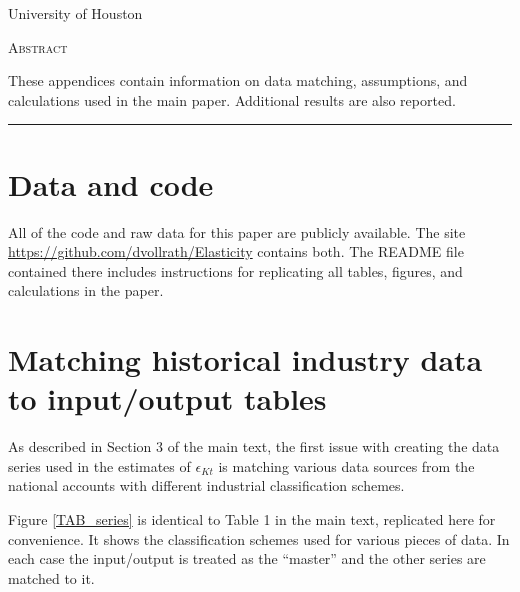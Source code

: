 \documentclass[11pt]{article}
\begin{document}
\begin{titlepage}
\vspace{2in} \noindent {\large \today}

\vspace{.5in} 

\vspace{.25in} 

\vspace{.05in} \noindent University of Houston

\vfill \noindent \textsc{Abstract} \hrulefill

\vspace{.05in} \noindent These appendices contain information on data matching, assumptions, and calculations used in the main paper. Additional results are also reported.
 
\vspace{.1in} \hrule

\vspace{.1in} 
\end{titlepage}

\pagebreak 

\tableofcontents
\listoffigures
\listoftables

\section{Data and code}
\onehalfspacing All of the code and raw data for this paper are publicly available. The site \url{https://github.com/dvollrath/Elasticity} contains both. The README file contained there includes instructions for replicating all tables, figures, and calculations in the paper. 

\section{Matching historical industry data to input/output tables}
As described in Section 3 of the main text, the first issue with creating the data series used in the estimates of $\epsilon_{Kt}$ is matching various data sources from the national accounts with different industrial classification schemes. 

Figure \ref{TAB_series} is identical to Table 1 in the main text, replicated here for convenience. It shows the classification schemes used for various pieces of data. In each case the input/output is treated as the ``master'' and the other series are matched to it. 
\end{document}
